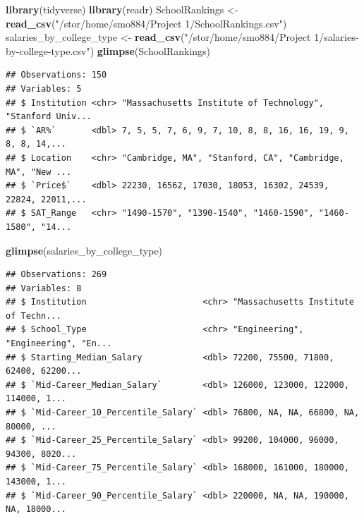 \documentclass[]{article}
\newenvironment{Shaded}{\begin{snugshade}}{\end{snugshade}}
\newcommand{\KeywordTok}[1]{\textcolor[rgb]{0.13,0.29,0.53}{\textbf{#1}}}
\newcommand{\DataTypeTok}[1]{\textcolor[rgb]{0.13,0.29,0.53}{#1}}
\newcommand{\StringTok}[1]{\textcolor[rgb]{0.31,0.60,0.02}{#1}}
\newcommand{\OperatorTok}[1]{\textcolor[rgb]{0.81,0.36,0.00}{\textbf{#1}}}
\newcommand{\NormalTok}[1]{#1}
\begin{document}
\begin{Shaded}
\begin{Highlighting}[]
\KeywordTok{library}\NormalTok{(tidyverse)}
\KeywordTok{library}\NormalTok{(readr)}
\NormalTok{SchoolRankings <-}\StringTok{ }\KeywordTok{read_csv}\NormalTok{(}\StringTok{"/stor/home/smo884/Project 1/SchoolRankings.csv"}\NormalTok{)}
\NormalTok{salaries_by_college_type <-}\StringTok{ }\KeywordTok{read_csv}\NormalTok{(}\StringTok{"/stor/home/smo884/Project 1/salaries-by-college-type.csv"}\NormalTok{)}
\KeywordTok{glimpse}\NormalTok{(SchoolRankings)}
\end{Highlighting}
\end{Shaded}

\begin{verbatim}
## Observations: 150
## Variables: 5
## $ Institution <chr> "Massachusetts Institute of Technology", "Stanford Univ...
## $ `AR%`       <dbl> 7, 5, 5, 7, 6, 9, 7, 10, 8, 8, 16, 16, 19, 9, 8, 8, 14,...
## $ Location    <chr> "Cambridge, MA", "Stanford, CA", "Cambridge, MA", "New ...
## $ `Price$`    <dbl> 22230, 16562, 17030, 18053, 16302, 24539, 22824, 22011,...
## $ SAT_Range   <chr> "1490-1570", "1390-1540", "1460-1590", "1460-1580", "14...
\end{verbatim}

\begin{Shaded}
\begin{Highlighting}[]
\KeywordTok{glimpse}\NormalTok{(salaries_by_college_type)}
\end{Highlighting}
\end{Shaded}

\begin{verbatim}
## Observations: 269
## Variables: 8
## $ Institution                       <chr> "Massachusetts Institute of Techn...
## $ School_Type                       <chr> "Engineering", "Engineering", "En...
## $ Starting_Median_Salary            <dbl> 72200, 75500, 71800, 62400, 62200...
## $ `Mid-Career_Median_Salary`        <dbl> 126000, 123000, 122000, 114000, 1...
## $ `Mid-Career_10_Percentile_Salary` <dbl> 76800, NA, NA, 66800, NA, 80000, ...
## $ `Mid-Career_25_Percentile_Salary` <dbl> 99200, 104000, 96000, 94300, 8020...
## $ `Mid-Career_75_Percentile_Salary` <dbl> 168000, 161000, 180000, 143000, 1...
## $ `Mid-Career_90_Percentile_Salary` <dbl> 220000, NA, NA, 190000, NA, 18000...
\end{verbatim}

\begin{Shaded}
\end{Shaded}
\end{document}
